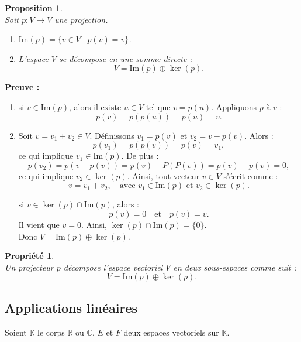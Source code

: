 \documentclass[a4paper, 14pt]{report}
\newtheorem{proposition}{Proposition}[section]
\newtheorem{propriety}{Propriété}[section]
\begin{document}
\begin{onehalfspace}
{			
			\begin{proposition} \cite{lang2012algebra}\\
				Soit \( p : V \to V \) une projection.
				\begin{enumerate}[label=\roman*)]
					\item \( \mathrm{Im}(p) = \{v \in V \mid p(v) = v\} \).
					\item L'espace \( V \) se décompose en une somme directe :
					\[
					V = \mathrm{Im}(p) \oplus \ker(p).
					\]
				\end{enumerate}
			\end{proposition}
			
			
			\textbf{\underline{Preuve :}}\\
			
			\begin{enumerate}[label=\roman*)]
				\item si \( v \in \mathrm{Im}(p) \), alors il existe \( u \in V \) tel que \( v = p(u) \). Appliquons \( p \) à \( v \) :
				\[
				p(v) = p(p(u)) = p(u) = v.
				\]
				\item  Soit	\(v = v_1 + v_2 \in V \). Définissons \( v_1 = p(v) \) et \( v_2 = v - p(v) \). Alors :
				\[
				p(v_1) = p(p(v)) = p(v) = v_1,
				\]
				ce qui implique \( v_1 \in \mathrm{Im}(p) \). De plus :
				\[
				p(v_2) = p(v - p(v)) = p(v) - P(P(v)) = p(v) - p(v) = 0,
				\]
				ce qui implique \( v_2 \in \ker(p) \). Ainsi, tout vecteur \( v \in V \) s'écrit comme :
				\[
				v = v_1 + v_2, \quad \text{avec } v_1 \in \mathrm{Im}(p) \text{ et } v_2 \in \ker(p).
				\]
				
				si \( v \in \ker(p) \cap \mathrm{Im}(p) \), alors :
				\[
				p(v) = 0 \quad \text{et} \quad p(v) = v.
				\]
				Il vient que \( v = 0 \). Ainsi, \( \ker(p) \cap \mathrm{Im}(p) = \{0\} \).\\
				Donc \(V = \mathrm{Im}(p) \oplus \ker(p).\)
				
			\end{enumerate}
			
			
			\begin{propriety} \cite{lang2012algebra}\\
				Un projecteur \( p \) décompose l'espace vectoriel \( V \) en deux sous-espaces comme suit :
				\[
				V = \mathrm{Im}(p) \oplus \ker(p).
				\]
			\end{propriety}
			
			
			
			\subsection{Applications linéaires}
			Soient $\mathbb{K}$ le corps $\mathbb{R}$ ou $\mathbb{C}$, $E$ et $F$ deux espaces vectoriels sur $\mathbb{K}$.
			
}
\end{onehalfspace}
\end{document}
